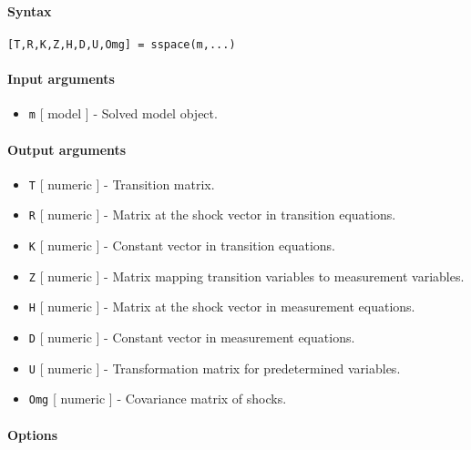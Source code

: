 


	\paragraph{Syntax}

\begin{verbatim}
[T,R,K,Z,H,D,U,Omg] = sspace(m,...)
\end{verbatim}

\paragraph{Input arguments}

\begin{itemize}
\itemsep1pt\parskip0pt
\item
  \texttt{m} {[} model {]} - Solved model object.
\end{itemize}

\paragraph{Output arguments}

\begin{itemize}
\item
  \texttt{T} {[} numeric {]} - Transition matrix.
\item
  \texttt{R} {[} numeric {]} - Matrix at the shock vector in transition
  equations.
\item
  \texttt{K} {[} numeric {]} - Constant vector in transition equations.
\item
  \texttt{Z} {[} numeric {]} - Matrix mapping transition variables to
  measurement variables.
\item
  \texttt{H} {[} numeric {]} - Matrix at the shock vector in measurement
  equations.
\item
  \texttt{D} {[} numeric {]} - Constant vector in measurement equations.
\item
  \texttt{U} {[} numeric {]} - Transformation matrix for predetermined
  variables.
\item
  \texttt{Omg} {[} numeric {]} - Covariance matrix of shocks.
\end{itemize}

\paragraph{Options}

